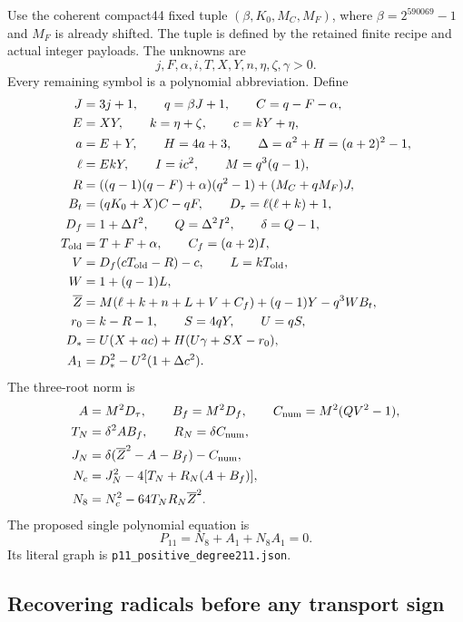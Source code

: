 Use the coherent compact44 fixed tuple $(\beta,K_0,M_C,M_F)$, where
$\beta=2^{590069}-1$ and $M_F$ is already shifted. The tuple is defined by
the retained finite recipe and actual integer payloads. The unknowns are
\[
 j,F,\alpha,i,T,X,Y,n,\eta,\zeta,\gamma>0.
\]
Every remaining symbol is a polynomial abbreviation. Define
\begin{align*}
 J&=3j+1,\qquad q=\beta J+1,\qquad C=q-F-\alpha,\\
 E&=XY,\qquad k=\eta+\zeta,\qquad c=kY+\eta,\\
 a&=E+Y,\qquad H=4a+3,\qquad\Delta=a^2+H=(a+2)^2-1,\\
 \ell&=EkY,\qquad I=ic^2,\qquad M=q^3(q-1),\\
 R&=((q-1)(q-F)+\alpha)(q^2-1)+(M_C+qM_F)J,\\
 B_t&=(qK_0+X)C-qF,\qquad D_\tau=\ell(\ell+k)+1,\\
 D_f&=1+\Delta I^2,\qquad Q=\Delta^2I^2,\qquad\delta=Q-1,\\
 T_{\rm old}&=T+F+\alpha,\qquad C_f=(a+2)I,\\
 V&=D_f(cT_{\rm old}-R)-c,\qquad L=kT_{\rm old},\\
 W&=1+(q-1)L,\\
 \overline Z&=M(\ell+k+n+L+V+C_f)+(q-1)Y-q^3WB_t,\\
 r_0&=k-R-1,\qquad S=4qY,\qquad U=qS,\\
 D_*&=U(X+ac)+H(U\gamma+SX-r_0),\\
 A_1&=D_*^2-U^2(1+\Delta c^2).
\end{align*}
The three-root norm is
\begin{align*}
 A&=M^2D_\tau,\qquad B_f=M^2D_f,\qquad C_{\rm num}=M^2(QV^2-1),\\
 T_N&=\delta^2AB_f,\qquad R_N=\delta C_{\rm num},\\
 J_N&=\delta(\overline Z^2-A-B_f)-C_{\rm num},\\
 N_c&=J_N^2-4[T_N+R_N(A+B_f)],\\
 N_8&=N_c^2-64T_NR_N\overline Z^2.
\end{align*}
The proposed single polynomial equation is
\begin{equation}\label{eq:offset-p211}
 \boxed{P_{11}=N_8+A_1+N_8A_1=0.}
\end{equation}
Its literal graph is \texttt{p11\_positive\_degree211.json}.

\subsection{Recovering radicals before any transport sign}

